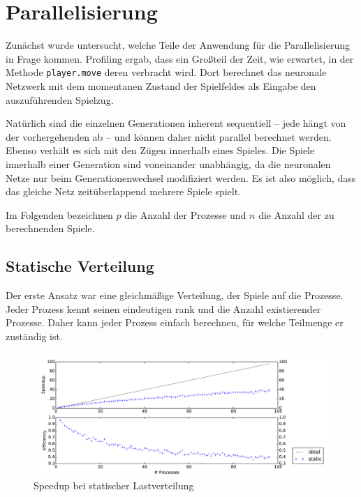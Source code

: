 \section{Parallelisierung}

Zunächst wurde untersucht, welche Teile der Anwendung für die Parallelisierung
in Frage kommen. Profiling ergab, dass ein Großteil der Zeit, wie erwartet, in
der Methode \texttt{player.move} deren verbracht wird. Dort berechnet das
neuronale Netzwerk mit dem momentanen Zustand der Spielfeldes als Eingabe den
auszuführenden Spielzug.

Natürlich sind die einzelnen Generationen inherent sequentiell -- jede hängt von
der vorhergehenden ab -- und können daher nicht parallel berechnet werden. 
Ebenso verhält es sich mit den Zügen innerhalb eines Spieles.
Die Spiele innerhalb einer Generation sind voneinander unabhängig, da die
neuronalen Netze nur beim Generationenwechsel modifiziert werden. Es ist also
möglich, dass das gleiche Netz zeitüberlappend mehrere Spiele spielt.

Im Folgenden bezeichnen $p$ die Anzahl der Prozesse und $n$ die Anzahl der zu
berechnenden Spiele.

\subsection{Statische Verteilung}

Der erste Ansatz war eine gleichmäßige Verteilung, der Spiele auf die Prozesse.
Jeder Prozess kennt seinen eindeutigen rank und die Anzahl existierender
Prozesse.  Daher kann jeder Prozess einfach berechnen, für welche Teilmenge er
zuständig ist.

\begin{figure}
    \centering
    \includegraphics[width=\textwidth]
        {content/img/strong_scaling_time_static.pdf}
    \caption{Speedup bei statischer Lastverteilung}
    \label{fig:speedup_static}
\end{figure}

